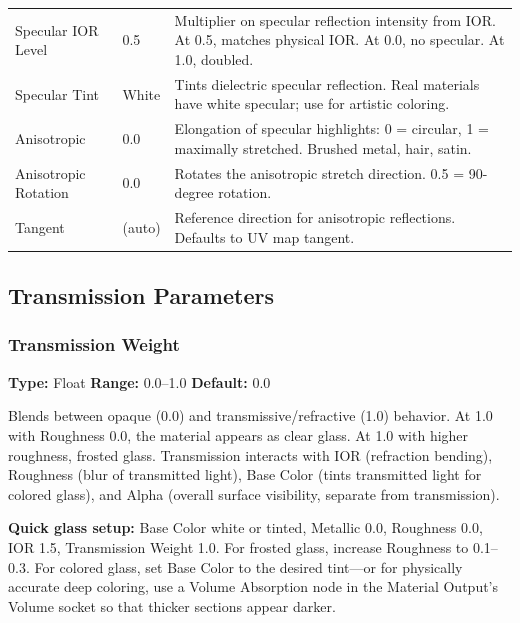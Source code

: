 \begin{center}
\begin{tabularx}{\textwidth}{L{4cm}C{2.5cm}X}
\toprule
{}
 &  &  \\
\midrule
Specular IOR Level & 0.5 & Multiplier on specular reflection intensity from IOR. At 0.5, matches physical IOR. At 0.0, no specular. At 1.0, doubled. \\
Specular Tint & White & Tints dielectric specular reflection. Real materials have white specular; use for artistic coloring. \\
Anisotropic & 0.0 & Elongation of specular highlights: 0 = circular, 1 = maximally stretched. Brushed metal, hair, satin. \\
Anisotropic Rotation & 0.0 & Rotates the anisotropic stretch direction. 0.5 = 90-degree rotation. \\
Tangent & (auto) & Reference direction for anisotropic reflections. Defaults to UV map tangent. \\
\bottomrule
\end{tabularx}
\end{center}

\subsection{Transmission Parameters}
\label{sec:shading:principled:transmission}

\subsubsection{Transmission Weight}
\textbf{Type:} Float \quad \textbf{Range:} 0.0--1.0 \quad
\textbf{Default:} 0.0

Blends between opaque (0.0) and transmissive/refractive (1.0)
behavior. At 1.0 with Roughness 0.0, the material appears as clear
glass. At 1.0 with higher roughness, frosted glass. Transmission
interacts with IOR (refraction bending), Roughness (blur of
transmitted light), Base Color (tints transmitted light for colored
glass), and Alpha (overall surface visibility, separate from
transmission).

\begin{tipbox}
\textbf{Quick glass setup:} Base Color white or tinted, Metallic
0.0, Roughness 0.0, IOR 1.5, Transmission Weight 1.0. For frosted
glass, increase Roughness to 0.1--0.3. For colored glass, set Base
Color to the desired tint---or for physically accurate deep
coloring, use a Volume Absorption node in the Material Output's
Volume socket so that thicker sections appear darker.
\end{tipbox}

